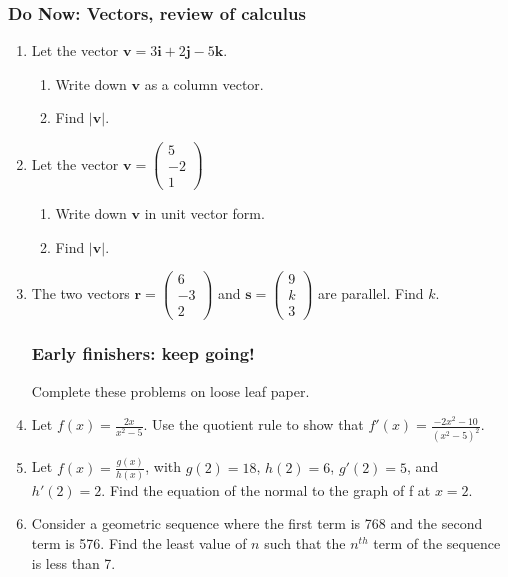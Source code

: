 \documentclass[12pt, twoside]{article}
\begin{document}
\subsubsection*{Do Now: Vectors, review of calculus}
\begin{enumerate}

\item Let the vector $\mathbf{v} = 3 \mathbf{i} + 2 \mathbf{j} -5 \mathbf{k}$.
  \begin{enumerate}
      \item Write down $\mathbf{v}$ as a column vector.
      \item Find $| \mathbf{v}|$.
  \end{enumerate} \vspace{2cm}

\item Let the vector $\mathbf{v}= \left(
      \begin{array}{c}
        5\\
        -2\\
        1
      \end{array} \right)$
  \begin{enumerate}
      \item Write down $\mathbf{v}$ in unit vector form.
      \item Find $| \mathbf{v}|$.
  \end{enumerate} \vspace{2cm}

\item The two vectors $\mathbf{r}= \left(
      \begin{array}{c}
        6\\
        -3\\
        2
      \end{array} \right)$ and
      $\mathbf{s}= \left(
      \begin{array}{c}
        9\\
        k\\
        3
      \end{array} \right)$ are parallel. Find $k$.  \vspace{3.5cm}

\subsubsection*{Early finishers: keep going!}
  Complete these problems on loose leaf paper.

\item Let $\displaystyle f(x)= \frac{2x}{x^2-5}$. Use the quotient rule to show that $\displaystyle f'(x)= \frac{-2x^2-10}{(x^2-5)^2}$.

\item Let $\displaystyle f(x) = \frac{g(x)}{h(x)}$, with $g(2)=18$, $h(2)=6$, $g'(2)=5$, and $h'(2)=2$. Find the equation of the normal to the graph of f at $x=2$.

\item Consider a geometric sequence where the first term is 768 and the second term is 576. Find the least value of $n$ such that the $n^{th}$ term of the sequence is less than 7.

\end{enumerate}
\end{document}
